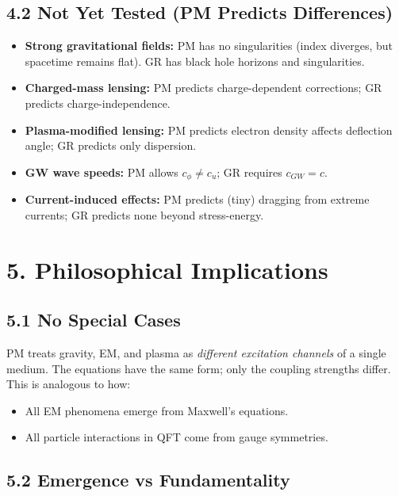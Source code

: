 \documentclass{article}
\begin{document}
\subsection*{4.2 Not Yet Tested (PM Predicts Differences)}

\begin{itemize}
    \item \textbf{Strong gravitational fields:} PM has no singularities (index
          diverges, but spacetime remains flat). GR has black hole horizons and
          singularities.
    \item \textbf{Charged-mass lensing:} PM predicts charge-dependent corrections;
          GR predicts charge-independence.
    \item \textbf{Plasma-modified lensing:} PM predicts electron density affects
          deflection angle; GR predicts only dispersion.
    \item \textbf{GW wave speeds:} PM allows $c_\phi \neq c_u$; GR requires $c_{GW} = c$.
    \item \textbf{Current-induced effects:} PM predicts (tiny) dragging from
          extreme currents; GR predicts none beyond stress-energy.
\end{itemize}

\section*{5. Philosophical Implications}

\subsection*{5.1 No Special Cases}

PM treats gravity, EM, and plasma as \emph{different excitation channels} of a
single medium. The equations have the same form; only the coupling strengths
differ. This is analogous to how:

\begin{itemize}
    \item All EM phenomena emerge from Maxwell's equations.
    \item All particle interactions in QFT come from gauge symmetries.
\end{itemize}

\subsection*{5.2 Emergence vs Fundamentality}
\end{document}
